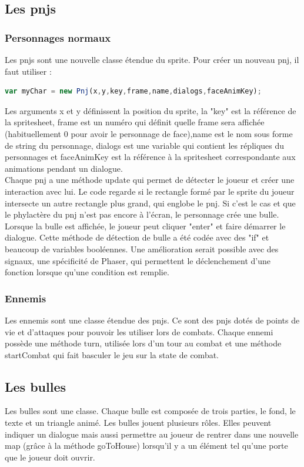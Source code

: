 \documentclass[11pt]{article}
\begin{document}
\subsection{Les pnjs}
\subsubsection{Personnages normaux}
Les pnjs sont une nouvelle classe étendue du sprite. Pour créer un nouveau pnj, il faut utiliser :
 \begin{lstlisting}[language=JavaScript]
var myChar = new Pnj(x,y,key,frame,name,dialogs,faceAnimKey);
\end{lstlisting}
Les arguments x et y définissent la position du sprite, la "key" est la référence de la spritesheet, frame est un numéro qui définit quelle frame sera affichée (habituellement 0 pour avoir le personnage de face),name est le nom sous forme de string du personnage, dialogs est une variable qui contient les répliques du personnages et faceAnimKey est la référence à la spritesheet correspondante aux animations pendant un dialogue. 
\\ Chaque pnj a une méthode update qui permet de détecter le joueur et créer une interaction avec lui. Le code regarde si le rectangle formé par le sprite du joueur intersecte un autre rectangle plus grand, qui englobe le pnj. Si c'est le cas et que le phylactère du pnj n'est pas encore à l'écran, le personnage crée une bulle. Lorsque la bulle est affichée, le joueur peut cliquer "enter" et faire démarrer le dialogue. Cette méthode de détection de bulle a été codée avec des "if" et beaucoup de variables booléennes. Une amélioration serait possible avec des signaux, une spécificité de Phaser, qui permettent le déclenchement d'une fonction lorsque qu'une condition est remplie.\subsubsection{Ennemis}
Les ennemis sont une classe étendue des pnjs. Ce sont des pnjs dotés de points de vie et d'attaques pour pouvoir les utiliser lors de combats. Chaque ennemi possède une méthode turn, utilisée lors d'un tour au combat et une méthode startCombat qui fait basculer le jeu sur la state de combat.
\subsection{Les bulles}
Les bulles sont une classe. Chaque bulle est composée de trois parties, le fond, le texte et un triangle animé. Les bulles jouent plusieurs rôles. Elles peuvent indiquer un dialogue mais aussi permettre au joueur de rentrer dans une nouvelle map (grâce à la méthode goToHouse) lorsqu'il y a un élément tel qu'une porte que le joueur doit ouvrir.
\end{document}
